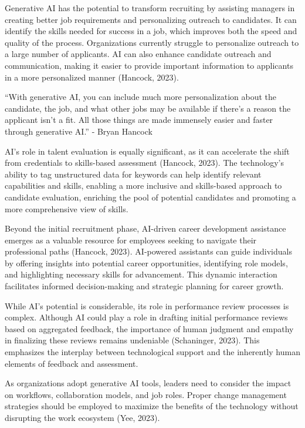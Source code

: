 \documentclass[
]{book}
\begin{document}
Generative AI has the potential to transform recruiting by assisting managers in creating better job requirements and personalizing outreach to candidates. It can identify the skills needed for success in a job, which improves both the speed and quality of the process. Organizations currently struggle to personalize outreach to a large number of applicants. AI can also enhance candidate outreach and communication, making it easier to provide important information to applicants in a more personalized manner (Hancock, 2023).

``With generative AI, you can include much more personalization about the candidate, the job, and what other jobs may be available if there's a reason the applicant isn't a fit. All those things are made immensely easier and faster through generative AI.''
- Bryan Hancock

AI's role in talent evaluation is equally significant, as it can accelerate the shift from credentials to skills-based assessment (Hancock, 2023). The technology's ability to tag unstructured data for keywords can help identify relevant capabilities and skills, enabling a more inclusive and skills-based approach to candidate evaluation, enriching the pool of potential candidates and promoting a more comprehensive view of skills.

Beyond the initial recruitment phase, AI-driven career development assistance emerges as a valuable resource for employees seeking to navigate their professional paths (Hancock, 2023). AI-powered assistants can guide individuals by offering insights into potential career opportunities, identifying role models, and highlighting necessary skills for advancement. This dynamic interaction facilitates informed decision-making and strategic planning for career growth.

While AI's potential is considerable, its role in performance review processes is complex. Although AI could play a role in drafting initial performance reviews based on aggregated feedback, the importance of human judgment and empathy in finalizing these reviews remains undeniable (Schaninger, 2023). This emphasizes the interplay between technological support and the inherently human elements of feedback and assessment.

As organizations adopt generative AI tools, leaders need to consider the impact on workflows, collaboration models, and job roles. Proper change management strategies should be employed to maximize the benefits of the technology without disrupting the work ecosystem (Yee, 2023).
\end{document}
